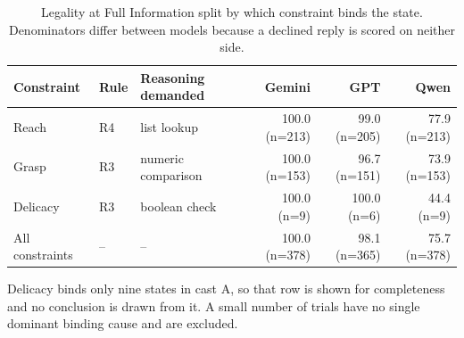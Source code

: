 \begin{table}[H]
  \centering
  \caption{Legality at Full Information split by which constraint binds the state. Denominators differ between models because a declined reply is scored on neither side.}
  \label{tab:ex1:constraints}
  \small
  \begin{tabular}{lllrrr}
    \toprule
    Constraint & Rule & Reasoning demanded & Gemini & GPT & Qwen \\
    \midrule
    Reach & R4 & list lookup & 100.0 (n=213) & 99.0 (n=205) & 77.9 (n=213) \\
    Grasp & R3 & numeric comparison & 100.0 (n=153) & 96.7 (n=151) & 73.9 (n=153) \\
    Delicacy & R3 & boolean check & 100.0 (n=9) & 100.0 (n=6) & 44.4 (n=9) \\
    All constraints & -- & -- & 100.0 (n=378) & 98.1 (n=365) & 75.7 (n=378) \\
    \bottomrule
  \end{tabular}
  \begin{minipage}{\linewidth}\vspace{2pt}\footnotesize Delicacy binds only nine states in cast A, so that row is shown for completeness and no conclusion is drawn from it. A small number of trials have no single dominant binding cause and are excluded.\end{minipage}
\end{table}
